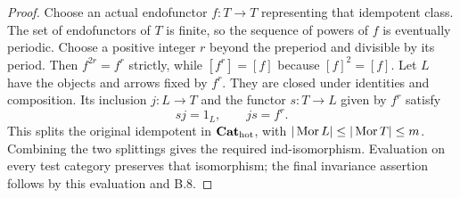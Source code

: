 \begin{proof}
Choose an actual endofunctor $f:T\to T$ representing that
idempotent class. The set of endofunctors of $T$ is finite, so
the sequence of powers of $f$ is eventually periodic. Choose a
positive integer $r$ beyond the preperiod and divisible by its
period. Then $f^{2r}=f^r$ strictly, while $[f^r]=[f]$ because
$[f]^2=[f]$. Let $L$ have the objects and arrows fixed by $f^r$.
They are closed under identities and composition. Its inclusion
$j:L\to T$ and the functor $s:T\to L$ given by $f^r$ satisfy
\[
                         sj=1_L,\qquad js=f^r.
\]
This splits the original idempotent in ${\mathbf{Cat}_{\mathrm{hot}}}$, with
$|\operatorname{Mor} L|\leq|\operatorname{Mor} T|\leq m$. Combining the two splittings
gives the required ind-isomorphism. Evaluation on every test
category preserves that isomorphism; the final invariance
assertion follows by this evaluation and B.8.
\end{proof}
